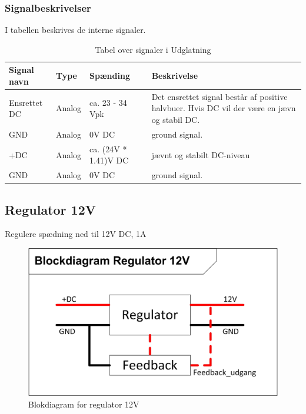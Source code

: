 \subsubsection{Signalbeskrivelser}
I tabellen beskrives de interne signaler.
\begin{table}[H]
\begin{tabular}{|p{3cm}|p{3cm}|p{3cm}|p{4.5cm}|} \hline
\cellcolor[gray]{0.85}Signal navn& \cellcolor[gray]{0.85}Type &\cellcolor[gray]{0.85}Spænding&\cellcolor[gray]{0.85}Beskrivelse\\ \hline
Ensrettet DC & Analog  & ca. 23 - 34 Vpk & Det ensrettet signal består af positive halvbuer. Hvis DC vil der være en jævn og stabil DC.\\  \hline
GND  & Analog & 0V DC & ground signal. \\  \hline
+DC & Analog & ca. (24V * 1.41)V DC & jævnt og stabilt DC-niveau\\ \hline
GND & Analog & 0V DC & ground signal.\\ \hline
\end{tabular}
\caption{Tabel over signaler i Udglatning}
\label{table:udglatning}
\end{table}
\newpage
\subsection{Regulator 12V}
Regulere spædning ned til 12V DC, 1A
\begin{figure}[H]
\centering
\includegraphics[scale=1]{billeder/Regulering_12VBlok}
\caption{Blokdiagram for regulator 12V}
\label{fig:regulator_12V}
\end{figure}
